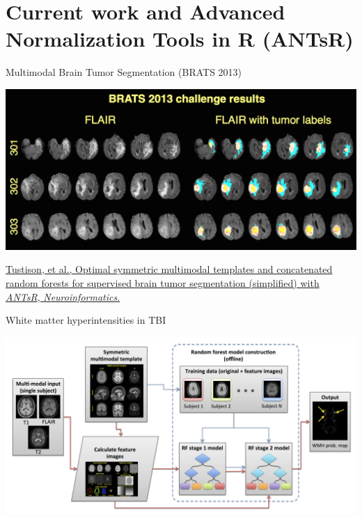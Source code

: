 \documentclass[ignorenonframetext,]{beamer}
\begin{document}
\section{Current work and Advanced Normalization Tools in R
(ANTsR)}\label{current-work-and-advanced-normalization-tools-in-r-antsr}

\begin{frame}{Multimodal Brain Tumor Segmentation (BRATS 2013)}

\includegraphics{./competitions/figures/brats2013results1.png}

\href{http://www.ncbi.nlm.nih.gov/pubmed/25433513}{Tustison, et al.,
Optimal symmetric multimodal templates and concatenated random forests
for supervised brain tumor segmentation (simplified) with \emph{ANTsR},
\emph{Neuroinformatics}.}

\end{frame}

\begin{frame}{White matter hyperintensities in TBI}

\includegraphics{./wmhs/figures/wmhPipeline.png}

\end{frame}
\end{document}
